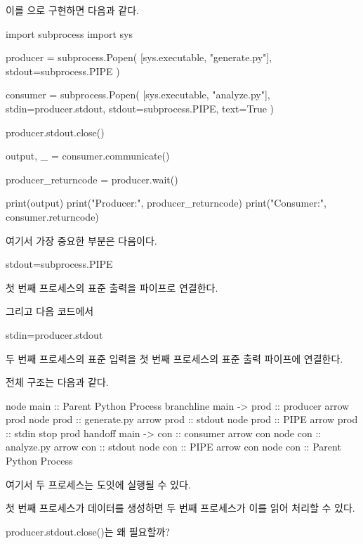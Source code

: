 이를 으로 구현하면 다음과 같다.

\begin{dhkcode}
import subprocess
import sys

producer = subprocess.Popen(
    [sys.executable, "generate.py"],
    stdout=subprocess.PIPE
)

consumer = subprocess.Popen(
    [sys.executable, "analyze.py"],
    stdin=producer.stdout,
    stdout=subprocess.PIPE,
    text=True
)

producer.stdout.close()

output, _ = consumer.communicate()

producer_returncode = producer.wait()

print(output)
print("Producer:", producer_returncode)
print("Consumer:", consumer.returncode)
\end{dhkcode}

여기서 가장 중요한 부분은 다음이다.

\begin{dhkzsh}
stdout=subprocess.PIPE
\end{dhkzsh}

첫 번째 프로세스의 표준 출력을 파이프로 연결한다.

그리고 다음 코드에서

\begin{dhkzsh}
stdin=producer.stdout
\end{dhkzsh}

두 번째 프로세스의 표준 입력을 첫 번째 프로세스의 표준 출력 파이프에 연결한다.

전체 구조는 다음과 같다.

\begin{dhkbranch}[in=8]
node main :: Parent Python Process
branchline main -> prod :: producer
arrow prod
node prod :: generate.py
arrow prod :: stdout
node prod :: PIPE
arrow prod :: stdin
stop prod
handoff main -> con :: consumer
arrow con
node con :: analyze.py
arrow con :: stdout
node con :: PIPE
arrow con
node con :: Parent Python Process
\end{dhkbranch}

여기서 두 프로세스는 도잇에 실행될 수 있다.

첫 번째 프로세스가 데이터를 생성하면 두 번째 프로세스가 이를 읽어 처리할 수 있다.

\begin{dhknote}
\begin{dhksmry}[centered]
producer.stdout.close()는 왜 필요할까?
\end{dhksmry}
\end{dhknote}

